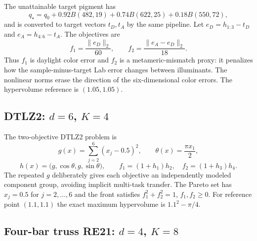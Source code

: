\documentclass{article}
\begin{document}
The unattainable target pigment has
\begin{equation}
q_\star=q_0+0.92B(482,19)+0.74B(622,25)+0.18B(550,72),
\end{equation}
and is converted to target vectors $t_D,t_A$ by the same pipeline.  Let
$e_D=h_{1:3}-t_D$ and $e_A=h_{4:6}-t_A$.  The objectives are
\begin{equation}
  f_1=\frac{\lVert e_D\rVert_2}{60},
  \qquad
  f_2=\frac{\lVert e_A-e_D\rVert_2}{18}.
  \label{eq:color-objectives}
\end{equation}
Thus $f_1$ is daylight color error and $f_2$ is a metameric-mismatch proxy: it
penalizes how the sample-minus-target Lab error changes between illuminants.
The nonlinear norms erase the direction of the six-dimensional color errors.
The hypervolume reference is $(1.05,1.05)$.

\subsection{DTLZ2: $d=6$, $K=4$}

The two-objective DTLZ2 problem \cite{deb2002scalable} is
\begin{equation}
 g(x)=\sum_{j=2}^{6}(x_j-0.5)^2,\qquad
 \theta(x)=\frac{\pi x_1}{2},
\end{equation}
\begin{equation}
 h(x)=\big(g,\cos\theta,g,\sin\theta\big),\qquad
 f_1=(1+h_1)h_2,\quad f_2=(1+h_3)h_4.
 \label{eq:dtlz}
\end{equation}
The repeated $g$ deliberately gives each objective an independently modeled
component group, avoiding implicit multi-task transfer.  The Pareto set has
$x_j=0.5$ for $j=2,\ldots,6$ and the front satisfies
$f_1^2+f_2^2=1$, $f_1,f_2\ge0$.  For reference point $(1.1,1.1)$ the exact
maximum hypervolume is $1.1^2-\pi/4$.

\subsection{Four-bar truss RE21: $d=4$, $K=8$}
\end{document}
